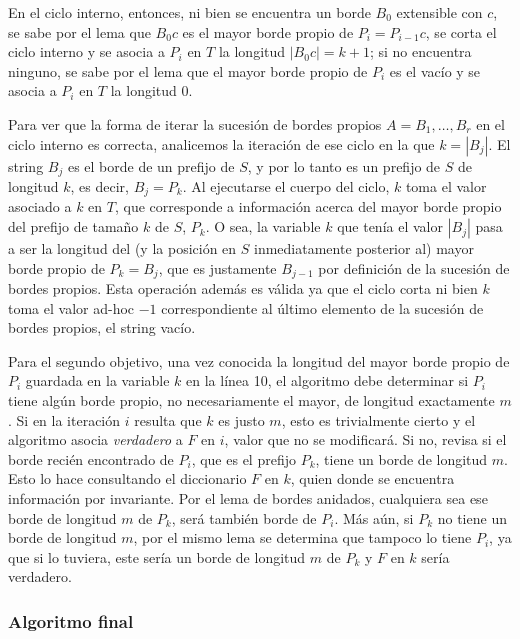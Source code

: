 En el ciclo interno, entonces, ni bien se encuentra un borde $B_0$ extensible con $c$, se sabe por el lema que $B_{0}c$ es el mayor borde propio de $P_i = P_{i-1}c$, se corta el ciclo interno y se asocia a $P_i$ en $T$ la longitud $|B_{0}c| = k+1$; si no encuentra ninguno, se sabe por el lema que el mayor borde propio de $P_i$ es el vacío y se asocia a $P_i$ en $T$ la longitud 0.

Para ver que la forma de iterar la sucesión de bordes propios $A = B_1, \dots, B_r$ en el ciclo interno es correcta, analicemos la iteración de ese ciclo en la que $k = |B_j|$. El string $B_j$ es el borde de un prefijo de $S$, y por lo tanto es un prefijo de $S$ de longitud $k$, es decir, $B_j = P_k$. Al ejecutarse el cuerpo del ciclo, $k$ toma el valor asociado a $k$ en $T$, que corresponde a información acerca del mayor borde propio del prefijo de tamaño $k$ de $S$, $P_k$. O sea, la variable $k$ que tenía el valor $|B_j|$ pasa a ser la longitud del (y la posición en $S$ inmediatamente posterior al) mayor borde propio de $P_k = B_j$, que es justamente $B_{j-1}$ por definición de la sucesión de bordes propios. Esta operación además es válida ya que el ciclo corta ni bien $k$ toma el valor ad-hoc $-1$ correspondiente al último elemento de la sucesión de  bordes propios, el string vacío.

\medskip

Para el segundo objetivo, una vez conocida la longitud del mayor borde propio de $P_i$ guardada en la variable $k$ en la línea 10, el algoritmo debe determinar si $P_i$ tiene algún borde propio, no necesariamente el mayor, de longitud exactamente $m$. Si en la iteración $i$ resulta que $k$ es justo $m$, esto es trivialmente cierto y el algoritmo asocia \textit{verdadero} a $F$ en $i$, valor que no se modificará. Si no, revisa si el borde recién encontrado de $P_i$, que es el prefijo $P_k$, tiene un borde de longitud $m$. Esto lo hace consultando el diccionario $F$ en $k$, quien donde se encuentra información por invariante. Por el lema de bordes anidados, cualquiera sea ese borde de longitud $m$ de $P_k$, será también borde de $P_i$. Más aún, si $P_k$ no tiene un borde de longitud $m$, por el mismo lema se determina que tampoco lo tiene $P_i$, ya que si lo tuviera, este sería un borde de longitud $m$ de $P_k$ y $F$ en $k$ sería verdadero.
 
\subsubsection{Algoritmo final}

